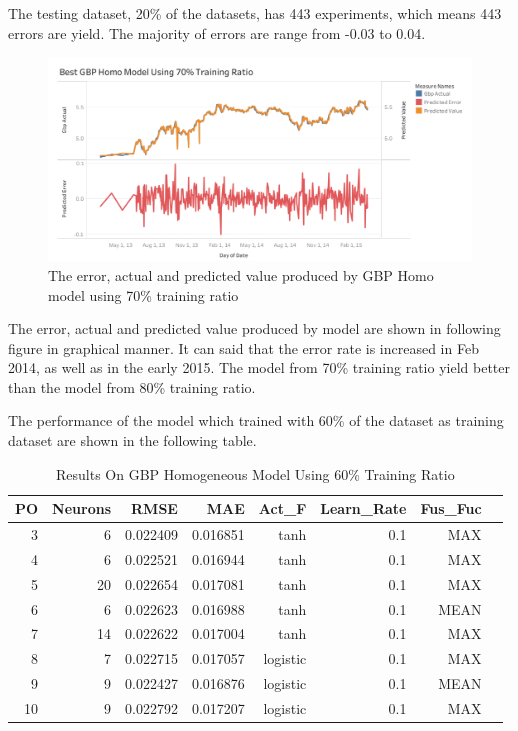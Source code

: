 {{{{{{{{{{{{{{{{{{		
The testing dataset, 20\% of the datasets, has 443 experiments, which means 443 errors are yield. The majority of errors are range from -0.03 to 0.04. 
		
		\begin{figure}[hbt!]\centering
			\includegraphics[width=1\textwidth]{best_gbp_homo_APV_70}
			\caption{The error, actual and predicted value produced by GBP Homo model using 70\% training ratio }
		\end{figure}
		\pagebreak
		
The error, actual and predicted value produced by model are shown in following figure in graphical manner.  It can said that the error rate is increased in  Feb 2014, as well as in the early 2015. The model from 70\% training ratio yield better than the model from 80\% training ratio.
		
The performance of the model which trained with 60\% of the dataset as training dataset are shown in the following table. 
		
		\setlength{\tabcolsep}{0.5em} %
		{\renewcommand{\arraystretch}{1.2}
			\begin{table}[ht]
				\centering
				\begin{tabular}{@{}rrrrrrrr@{}}
					\toprule
					\textbf{PO}&\textbf{Neurons}& \textbf{RMSE} & \textbf{MAE} & \textbf{Act\_F}  & \textbf{Learn\_Rate}&\textbf{ Fus\_Fuc}\\ 
					\midrule
					3 & 6 & 0.022409 & 0.016851 & tanh & 0.1 & MAX \\ 
					4 & 6 & 0.022521 & 0.016944 & tanh & 0.1 & MAX \\ 
					5 & 20 & 0.022654 & 0.017081 & tanh & 0.1 & MAX \\ 
					6 & 6 & 0.022623 & 0.016988 & tanh & 0.1 & MEAN \\ 
					7 & 14 & 0.022622 & 0.017004 & tanh & 0.1 & MAX \\ 
					8 & 7 & 0.022715 & 0.017057 & logistic & 0.1 & MAX \\ 
					9 & 9 & 0.022427 & 0.016876 & logistic & 0.1 & MEAN \\ 
					10 & 9 & 0.022792 & 0.017207 & logistic & 0.1 & MAX \\ 		
					\hline
				\end{tabular}
				\hspace*{1cm}
				\caption{Results On GBP Homogeneous Model Using 60\% Training Ratio}
			\end{table}
			
}}}}}}}}}}}}}}}}}}}
